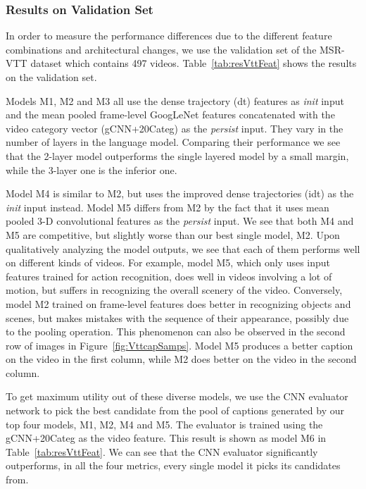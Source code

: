\subsubsection{Results on Validation Set}
In order to measure the performance differences due to the different feature
combinations and architectural changes, we use the validation set of the MSR-VTT
dataset which contains 497 videos.
Table~\ref{tab:resVttFeat} shows the results on the validation set.

Models M1, M2 and M3 all use the dense trajectory (dt) features as
\emph{init} input and the mean pooled frame-level GoogLeNet features
concatenated with the video category vector (gCNN+20Categ) as the \emph{persist}
input.
They vary in the number of layers in the language model.
Comparing their performance we see that the 2-layer model outperforms the single
layered model by a small margin, while the 3-layer one is the inferior one.

Model M4 is similar to M2, but uses the improved dense trajectories (idt) as
the \emph{init} input instead.
Model M5 differs from M2 by the fact that it uses mean pooled 3-D
convolutional features as the \emph{persist} input.
We see that both M4 and M5 are competitive, but slightly worse than our best
single model, M2.
Upon qualitatively analyzing the model outputs, we see that each of them
performs well on different kinds of videos.
For example, model M5, which only uses input features trained for action
recognition, does well in videos involving a lot of motion, but suffers in
recognizing the overall scenery of the video.
Conversely, model M2 trained on frame-level features does better in recognizing
objects and scenes, but makes mistakes with the sequence of their appearance,
possibly due to the pooling operation.
This phenomenon can also be observed in the second row of images in
Figure~\ref{fig:VttcapSamps}. Model M5 produces a better caption on the video in
the first column, while M2 does better on the video in the second column.

To get maximum utility out of these diverse models, we use the CNN evaluator
network to pick the best candidate from the pool of captions generated by our
top four models, M1, M2, M4 and M5.
The evaluator is trained using the gCNN+20Categ as the video feature.
This result is shown as model M6 in Table~\ref{tab:resVttFeat}.
We can see that the CNN evaluator significantly outperforms, in all the four
metrics, every single model it picks its candidates from.


